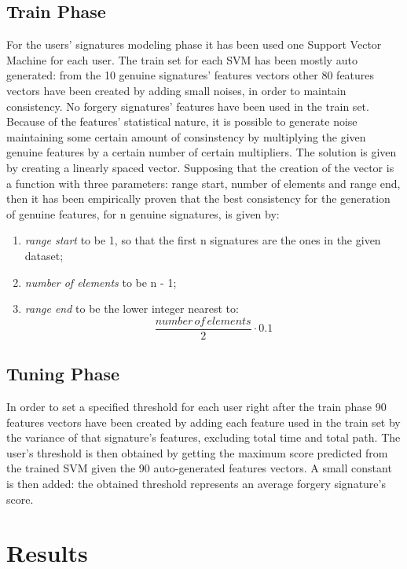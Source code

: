 \documentclass[a4paper, 10pt, conference]{IEEEconf}
\begin{document}
\subsection{Train Phase}
For the users' signatures modeling phase it has been used one Support Vector Machine for each user. The train set for each SVM has been mostly auto generated: from the 10 genuine signatures' features vectors other 80 features vectors have been created by adding small noises, in order to maintain consistency. \newline
No forgery signatures' features have been used in the train set.
Because of the features' statistical nature, it is possible to generate noise maintaining some certain amount of consinstency by multiplying the given genuine features by a certain number of certain multipliers. \newline
The solution is given by creating a linearly spaced vector. Supposing that the creation of the vector is a function with three parameters: range start, number of elements and range end, then it has been empirically proven that the best consistency for the generation of genuine features, for n genuine signatures, is given by:
	\begin{enumerate}[label=(\roman*)]
		\item 
			\textit{range start} to be 1, so that the first n signatures are the ones in the given dataset; 
      	\item 
      		\textit{number of elements} to be n - 1;
		\item 
			\textit{range end} to be the lower integer nearest to: \[ \frac{number\,of\,elements}{2} \cdot 0.1 \]
    \end{enumerate}

\subsection{Tuning Phase}
In order to set a specified threshold for each user right after the train phase 90 features vectors have been created by adding each feature used in the train set by the variance of that signature's features, excluding total time and total path. \newline
    The user's threshold is then obtained by getting the maximum score predicted from the trained SVM given the 90 auto-generated features vectors. A small constant is then added: the obtained threshold represents an average forgery signature's score.

\section{Results}
\end{document}
